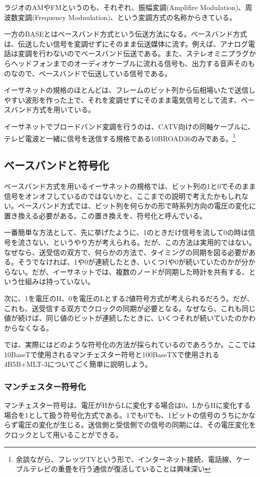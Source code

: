 ラジオのAMやFMというのも、それぞれ、振幅変調(Amplifire Modulation)、周波数変調(Frequency Moduulation)、という変調方式の名称からきている。

一方のBASEとはベースバンド方式という伝送方法になる。ベースバンド方式は、伝送したい信号を変調せずにそのまま伝送媒体に流す。例えば、アナログ電話は変調を行わないのでベースバンド伝送である。また、ステレオミニプラグからヘッドフォンまでのオーディオケーブルに流れる信号も、出力する音声そのものなので、ベースバンドで伝送している信号である。

イーサネットの規格のほとんどは、フレームのビット列から伝相場いたで送信しやすい波形を作った上で、それを変調せずにそのまま電気信号として流す、ベースバンド方式を用いている。

イーサネットでブロードバンド変調を行うのは、CATV向けの同軸ケーブルに、テレビ電波と一緒に信号を送信する規格である10BROAD36のみである。\footnote{余談ながら、フレッツTVという形で、インターネット接続、電話線、ケーブルテレビの重畳を行う通信が復活していることは興味深い}

\subsection{ベースバンドと符号化}

ベースバンド方式を用いるイーサネットの規格では、ビット列の1と0でそのまま信号をオンオフしているのではないかと、ここまでの説明で考えたかもしれない。ベースバンド方式では、ビット列を何らかの形で時系列方向の電圧の変化に置き換える必要がある。この置き換えを、符号化と呼んでいる。

一番簡単な方法として、先に挙げたように、1のときだけ信号を流して0の時は信号を流さない、というやり方が考えられる。だが、この方法は実用的ではない。なぜなら、送受信の双方で、何らかの方法で、タイミングの同期を図る必要がある。そうでなければ、1や0が連続したとき、いくつ1や0が続いていたのかが分からない。だが、イーサネットでは、複数のノードが同期した時計を共有する、という仕組みは持っていない。

次に、1を電圧のH、0を電圧のLとする2値符号方式が考えられるだろう。だが、これも、送受信する双方でクロックの同期が必要となる。なぜなら、これも同じ値が続けば、同じ値のビットが連続したときに、いくつそれが続いていたのかわからなくなる。

では、実際にはどのような符号化の方法が採られているのであろうか。ここでは10BaseTで使用されるマンチェスター符号と100BaseTXで使用される4B5B+MLT-3についてごく簡単に説明しよう。

\subsubsection{マンチェスター符号化}
マンチェスター符号は、電圧がHからLに変化する場合は0、LからHに変化する場合を1として扱う符号化方式である。1でも0でも、1ビットの信号のうちにかならず電圧の変化が生じる。送信側と受信側での信号の同期には、その電圧変化をクロックとして用いることができる。

